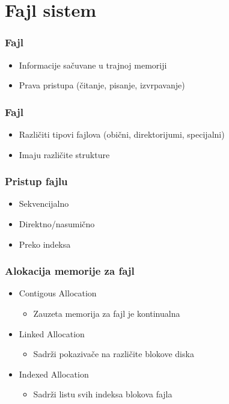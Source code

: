 \documentclass{beamer}
\begin{document}
\section*{Fajl sistem}
\begin{frame}
    \frametitle{Fajl}
    \begin{itemize}
        \item Informacije sačuvane u trajnoj memoriji \newline
        \item Prava pristupa (čitanje, pisanje, izvrpavanje)
    \end{itemize}
\end{frame}

\begin{frame}
    \frametitle{Fajl}
    \begin{itemize}
        \item Različiti tipovi fajlova (obični, direktorijumi, specijalni) \newline
        \item Imaju različite strukture \newline
    \end{itemize}
\end{frame}

\begin{frame}
    \frametitle{Pristup fajlu}
    \begin{itemize}
        \item Sekvencijalno \newline
        \item Direktno/nasumično \newline
        \item Preko indeksa
    \end{itemize}
\end{frame}

\begin{frame}
    \frametitle{Alokacija memorije za fajl}
    \begin{itemize}
        \item Contigous Allocation \begin{itemize}
            \item Zauzeta memorija za fajl je kontinualna \newline
        \end{itemize}
        \item Linked Allocation \begin{itemize}
            \item Sadrži pokazivače na različite blokove diska \newline
        \end{itemize}
        \item Indexed Allocation \begin{itemize}
            \item Sadrži listu svih indeksa blokova fajla
        \end{itemize}
    \end{itemize}
\end{frame}
\end{document}
